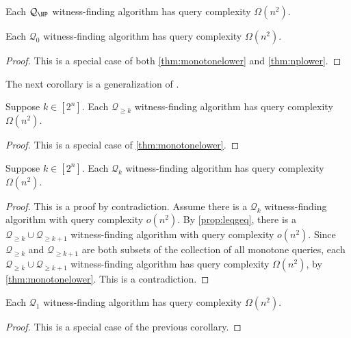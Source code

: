 \documentclass{article}
\newcommand{\mc}{\mathcal}
\begin{document}
\begin{theorem}\label{thm:nplower}
  Each $\mc{Q}_{\NP}$ witness-finding algorithm has query complexity $\Omega(n^2)$.
\end{theorem}

\begin{corollary}\label{cor:q0lower}
  Each $\mc{Q}_0$ witness-finding algorithm has query complexity $\Omega(n^2)$.
\end{corollary}
\begin{proof}
  This is a special case of both \autoref{thm:monotonelower} and \autoref{thm:nplower}.
\end{proof}

The next corollary is a generalization of \autocite[Remark~2]{krw12}.

\begin{corollary}\label{cor:geqk}
  Suppose $k \in \left[2^n\right]$.
  Each $\mc{Q}_{\geq k}$ witness-finding algorithm has query complexity $\Omega(n^2)$.
\end{corollary}
\begin{proof}
  This is a special case of \autoref{thm:monotonelower}.
\end{proof}

\begin{corollary}\label{cor:equalsk}
  Suppose $k \in \left[2^n\right]$.
  Each $\mc{Q}_k$ witness-finding algorithm has query complexity $\Omega(n^2)$.
\end{corollary}
\begin{proof}
  This is a proof by contradiction.
  Assume there is a $\mc{Q}_k$ witness-finding algorithm with query complexity $o(n^2)$.
  By \autoref{prop:leqgeq}, there is a $\mc{Q}_{\geq k} \cup \mc{Q}_{\geq k + 1}$ witness-finding algorithm with query complexity $o(n^2)$.
  Since $\mc{Q}_{\geq k}$ and $\mc{Q}_{\geq k + 1}$ are both subsets of the collection of all monotone queries, each $\mc{Q}_{\geq k} \cup \mc{Q}_{\geq k + 1}$ witness-finding algorithm has query complexity $\Omega(n^2)$, by \autoref{thm:monotonelower}.
  This is a contradiction.
\end{proof}

\begin{corollary}\label{cor:q1lower}
  Each $\mc{Q}_1$ witness-finding algorithm has query complexity $\Omega(n^2)$.
\end{corollary}
\begin{proof}
  This is a special case of the previous corollary.
\end{proof}
\end{document}
